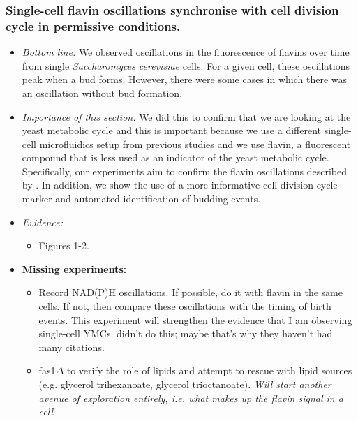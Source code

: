 \subsubsection{Single-cell flavin oscillations synchronise with cell division cycle in permissive conditions.}
\label{sec:org4e41d39}
\begin{itemize}
\item \emph{Bottom line:} We observed oscillations in the fluorescence of flavins over time from single \emph{Saccharomyces cerevisiae} cells.  For a given cell, these oscillations peak when a bud forms.  However, there were some cases in which there was an oscillation without bud formation.
\item \emph{Importance of this section:} We did this to confirm that we are looking at the yeast metabolic cycle and this is important because we use a different single-cell microfluidics setup from previous studies and we use flavin, a fluorescent compound that is less used as an indicator of the yeast metabolic cycle.  Specifically, our experiments aim to confirm the flavin oscillations described by \cite{baumgartnerFlavinbasedMetabolicCycles2018}.  In addition, we show the use of a more informative cell division cycle marker and automated identification of budding events.
\item \emph{Evidence:}
\begin{itemize}
\item Figures 1-2.
\end{itemize}

\item \textbf{Missing experiments:}
\begin{itemize}
\item Record NAD(P)H oscillations.  If possible, do it with flavin in the same cells.  If not, then compare these oscillations with the timing of birth events.  This experiment will strengthen the evidence that I am observing single-cell YMCs.  \cite{baumgartnerFlavinbasedMetabolicCycles2018} didn't do this; maybe that's why they haven't had many citations.
\item fas1\(\Delta\) to verify the role of lipids and attempt to rescue with lipid sources (e.g. glycerol trihexanoate, glycerol trioctanoate). \emph{Will start another avenue of exploration entirely, i.e. what makes up the flavin signal in a cell}
\end{itemize}
\end{itemize}
